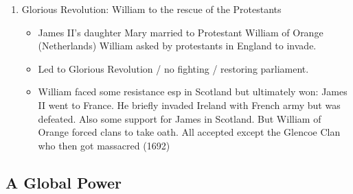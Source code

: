 \documentclass{amsart}
\begin{document}
\begin{enumerate}
\item Glorious Revolution: William to the rescue of the Protestants
	\begin{itemize}
		\item James II's daughter Mary married to Protestant William of Orange (Netherlands) William asked by protestants in England to invade. 
		\item Led to Glorious Revolution / no fighting / restoring parliament. 
		\item William faced some resistance esp in Scotland but ultimately won: James II went to France. He briefly invaded Ireland with French army but was defeated. Also some support for James in Scotland. But William of Orange forced clans to take oath. All accepted except the Glencoe Clan who then got massacred (1692)
	\end{itemize}
\end{enumerate}


\subsection{A Global Power}
\end{document}
